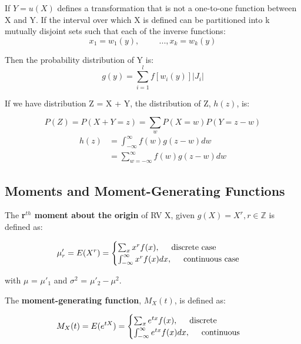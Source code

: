 \documentclass[10pt, letterpaper, twoside]{article}
\begin{document}
\begin{multicols}{2}
If $Y = u(X)$ defines a transformation that is not a one-to-one function between X and Y. If the interval over which X is defined can be partitioned into k mutually disjoint sets such that each of the inverse functions:
\begin{equation*}
    x_1 = w_1(y), \hspace{1cm} ..., x_k = w_k(y)
\end{equation*}

Then the probability distribution of Y is:
\begin{equation*}
    g(y) = \sum_{i=1}^lf[w_i(y)]|J_i|
\end{equation*}

If we have distribution Z = X + Y, the distribution of Z, $h(z)$, is:

\begin{equation*}
    P(Z) = P(X + Y = z) = \sum_wP(X = w)P(Y = z-w)
\end{equation*}
\begin{align*}
    h(z) &= \int_{-\infty}^{\infty}f(w)g(z-w)dw \\
    &= \sum_{w =-\infty}^{\infty}f(w)g(z-w)dw
\end{align*}

\subsection{Moments and Moment-Generating Functions}

The \textbf{r$^{th}$ moment about the origin} of RV X, given $g(X) = X^r, r \in \mathbb{Z}$ is defined as:

\begin{equation*}
    \mu'_r = E(X^r) = \begin{cases}
        \sum_xx^rf(x), \hspace{0.5cm} \text{discrete case}\\
        \int_{-\infty}^{\infty}x^rf(x)dx, \hspace{0.5cm} \text{continuous case}
    \end{cases}
\end{equation*}

with $\mu$ = $\mu'_1$ and $\sigma^2$ = $\mu'_2 - \mu^2$.

The \textbf{moment-generating function}, $M_X(t)$, is defined as:

\begin{equation*}
    M_X(t) = E(e^{tX}) = \begin{cases}
        \sum_xe^{tx}f(x), \hspace{0.5cm} \text{discrete}\\
        \int_{-\infty}^{\infty}e^{tx}f(x)dx, \hspace{0.5cm} \text{continuous}
    \end{cases}
\end{equation*}


\end{multicols}
\end{document}

